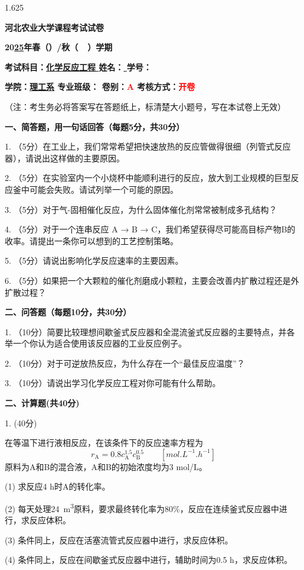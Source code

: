 \documentclass[12pt, b5paper]{article}
\newcommand*{\cred}{\textcolor{red}}
\begin{document}
\begin{spacing}{1.625}

\centerline{{\huge \bf{河北农业大学课程考试试卷}}}

\centerline{\bf{\large 20\underline{25}年春（\quad ）/秋（\ \surd \ ）学期}}

{\bf{考试科目：\underline{\quad 化学反应工程 \quad} \hfill 姓名：\underline{ \qquad \qquad} \hfill 学号：\underline{ \qquad \qquad \qquad \qquad}}}

{\bf{学院：\underline{\quad 理工系\quad } \hfill 专业班级：\underline{\qquad \qquad \qquad \qquad} \hfill 卷别：\cred{A} \hfill 考核方式：\cred{开卷}}}

（注：考生务必将答案写在答题纸上，标清楚大小题号，写在本试卷上无效）

\bigskip


{\bf{一、简答题，用一句话回答（每题5分，共30分）}}

1. （5分）在工业上，我们常常希望把快速放热的反应管做得很细（列管式反应器），请说出这样做的主要原因。

\bigskip

2. （5分）在实验室内一个小烧杯中能顺利进行的反应，放大到工业规模的巨型反应釜中可能会失败。请试列举一个可能的原因。

\bigskip

3. （5分）对于气-固相催化反应，为什么固体催化剂常常被制成多孔结构？

\bigskip

4. （5分）对于一个连串反应 A → B → C，我们希望获得尽可能高目标产物B的收率。请提出一条你可以想到的工艺控制策略。

\bigskip

5. （5分）请说出影响化学反应速率的主要因素。

\bigskip

6. （5分）如果把一个大颗粒的催化剂磨成小颗粒，主要会改善内扩散过程还是外扩散过程？

\bigskip

{\bf{二、问答题（每题10分，共30分）}}

1. （10分）简要比较理想间歇釜式反应器和全混流釜式反应器的主要特点，并各举一个你认为适合使用该反应器的工业反应例子。

\bigskip

2. （10分）对于可逆放热反应，为什么存在一个“最佳反应温度”？

\bigskip

3. （10分）请说出学习化学反应工程对你可能有什么帮助。

\newpage
{\bf{二、计算题(共40分)}}

1. (40分)

在等温下进行液相反应，在该条件下的反应速率方程为
\[
    r_\mathrm{A} = 0.8c_\mathrm{A}^{1.5}c_\mathrm{B}^{0.5} \qquad [\si{mol.L^{-1}.h^{-1}}]
\]
原料为A和B的混合液，A和B的初始浓度均为3 mol/L。

(1) 求反应4 h时A的转化率。

(2) 每天处理\SI{24}{m^3}原料，要求最终转化率为80\%，反应在连续釜式反应器中进行，求反应体积。

(3) 条件同上，反应在活塞流管式反应器中进行，求反应体积。

(4) 条件同上，反应在间歇釜式反应器中进行，辅助时间为0.5 h，求反应体积。


\end{spacing}
\end{document}
